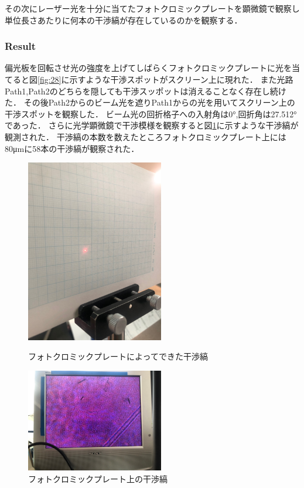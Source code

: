 \documentclass[11pt, a4paper]{jsarticle}
\begin{document}
その次にレーザー光を十分に当てたフォトクロミックプレートを顕微鏡で観察し単位長さあたりに何本の干渉縞が存在しているのかを観察する．

\subsubsection{Result}
偏光板を回転させ光の強度を上げてしばらくフォトクロミックプレートに光を当てると図\ref{fig:28}に示すような干渉スポットがスクリーン上に現れた．
また光路Path1,Path2のどちらを隠しても干渉スッポットは消えることなく存在し続けた．
その後Path2からのビーム光を遮りPath1からの光を用いてスクリーン上の干渉スポットを観察した．
ビーム光の回折格子への入射角は0°,回折角は27.512°であった．
さらに光学顕微鏡で干渉模様を観察すると図\ref{fig:29}に示すような干渉縞が観測された．
干渉縞の本数を数えたところフォトクロミックプレート上には80μmに58本の干渉縞が観察された．
\begin{figure}[htbp]
 \begin{minipage}{0.45\hsize}
  \begin{center}
   \includegraphics[width=60mm]{fig28.png}
  \end{center}
  \caption{フォトクロミックプレートによってできた干渉縞}
  \label{fig:28}
 \end{minipage}
 \begin{minipage}{0.45\hsize}
  \begin{center}
   \includegraphics[width=60mm]{fig29.png}
  \end{center}
  \caption{フォトクロミックプレート上の干渉縞}
  \label{fig:29}
 \end{minipage}
\end{figure}
\end{document}
